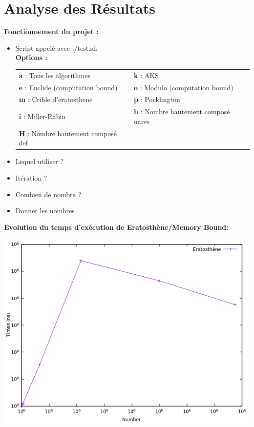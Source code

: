 	\section{Analyse des Résultats}
		\begin{frame}
		\textbf{Fonctionnement du projet :}

	\begin{itemize}
		\item Script appelé avec ./test.sh\\
\textbf{Options :}


	\begin{center}\footnotesize\begin{longtable}{l l}		
	\textbf{a} : Tous les algorithmes  & \textbf{k} : AKS\\
	\textbf{e} : Euclide (computation bound) & \textbf{o} : Modulo (computation bound)\\
	\textbf{m} : Crible d'eratosthene & \textbf{p} : Pocklington\\
	\textbf{i} : Miller-Rabin & \textbf{h} : Nombre hautement composé naive\\
	\textbf{H} : Nombre hautement composé def\\
	\end{longtable}\vspace{-2.2em}\end{center}

		\item Lequel utiliser ?\\
		\item Itération ?\\
		\item Combien de nombre ?\\
		\item Donner les nombres\\
	\end{itemize}
		\end{frame}
		\begin{frame}
		\textbf{Evolution du temps d'exécution de Eratosthène/Memory Bound: }
		\begin{center}\includegraphics[scale=0.6]{eratosthene.png}\end{center}
		\end{frame}
		
